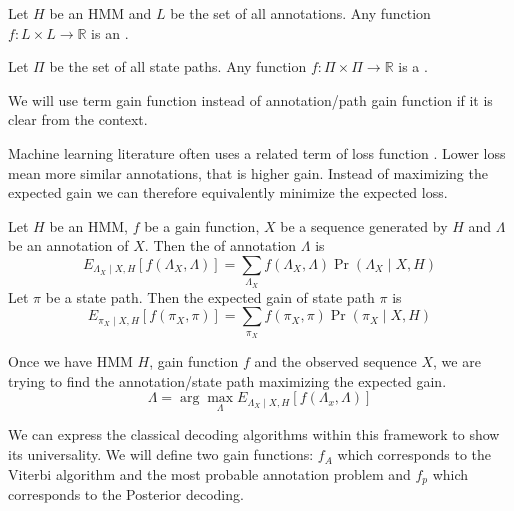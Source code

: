 \begin{definition}
Let $H$ be an HMM and $L$ be the set of all annotations. Any function
$f:L\times L\to \mathbb{R}$ is an .

Let $\Pi$ be the set of all state paths. Any function $f:\Pi\times
\Pi\to\mathbb{R}$ is a .
\label{DEFINITION:GAINFUNCTION}
\end{definition}

\begin{note}
We will use term gain function instead of annotation/path gain function if it is
clear from the context.

Machine learning literature often uses a related term of loss function
\cite{Lember2010}. Lower loss mean more similar annotations, that is higher gain. Instead
of maximizing the expected gain we can therefore equivalently minimize the expected
loss.
\end{note}

\begin{definition}
Let $H$ be an HMM, $f$ be a gain function, $X$ be a sequence generated by $H$ and
$\Lambda$ be an annotation of $X$. Then the  of annotation
$\Lambda$ is 
\begin{equation}
E_{\Lambda_X\mid X,H}[f(\Lambda_X,\Lambda)] =
\sum_{\Lambda_X}f(\Lambda_X,\Lambda)\Pr\left(\Lambda_X\mid X,H\right)
\end{equation}
Let $\pi$ be a state path. Then the expected gain of state path $\pi$ is 
\begin{equation}
E_{\pi_X\mid X,H}[f(\pi_X,\pi)] =
\sum_{\pi_X}f(\pi_X,\pi)\Pr\left(\pi_X\mid X,H\right)
\end{equation}
\end{definition}


Once we have HMM $H$, gain function $f$ and the observed sequence $X$,
we are trying to find the annotation/state path maximizing the expected gain. 
\begin{equation}
\Lambda = \arg\max_{\Lambda}E_{\Lambda_X\mid
X,H}\left[f\left(\Lambda_x,\Lambda\right)\right]
\end{equation}

We can express the classical decoding algorithms within this framework to show
its universality. We will define two gain functions: $f_A$ which corresponds to
the  
Viterbi algorithm and the most probable annotation problem and $f_p$ which
corresponds to 
the Posterior decoding.


